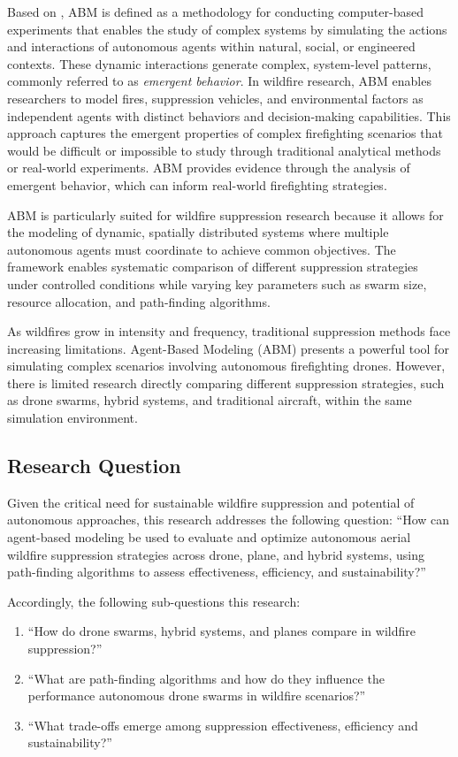 \documentclass[11pt, a4paper]{article}
\begin{document}
Based on \citet{wilensky2015introduction}, ABM is defined as a methodology for conducting computer-based experiments that enables the study of complex systems by simulating the actions and interactions of autonomous agents within natural, social, or engineered contexts. These dynamic interactions generate complex, system-level patterns, commonly referred to as \textit{emergent behavior}. In wildfire research, ABM enables researchers to model fires, suppression vehicles, and environmental factors as independent agents with distinct behaviors and decision-making capabilities. This approach captures the emergent properties of complex firefighting scenarios that would be difficult or impossible to study through traditional analytical methods or real-world experiments. ABM provides evidence through the analysis of emergent behavior, which can inform real-world firefighting strategies.

ABM is particularly suited for wildfire suppression research because it allows for the modeling of dynamic, spatially distributed systems where multiple autonomous agents must coordinate to achieve common objectives. The framework enables systematic comparison of different suppression strategies under controlled conditions while varying key parameters such as swarm size, resource allocation, and path-finding algorithms.

As wildfires grow in intensity and frequency, traditional suppression methods face increasing limitations. Agent-Based Modeling (ABM) presents a powerful tool for simulating complex scenarios involving autonomous firefighting drones. However, there is limited research directly comparing different suppression strategies, such as drone swarms, hybrid systems, and traditional aircraft, within the same simulation environment.

\subsection{Research Question}
Given the critical need for sustainable wildfire suppression and potential of autonomous approaches, this research addresses the following question:
\indent \enquote{How can agent-based modeling be used to evaluate and optimize autonomous aerial wildfire suppression strategies across drone, plane, and hybrid systems, using path-finding algorithms to assess effectiveness, efficiency, and sustainability?}

Accordingly, the following sub-questions this research:
\begin{enumerate}
  \item ``How do drone swarms, hybrid systems, and planes compare in wildfire suppression?''
  \item ``What are path-finding algorithms and how do they influence the performance autonomous drone swarms in wildfire scenarios?''
  \item ``What trade-offs emerge among suppression effectiveness, efficiency and sustainability?''
\end{enumerate}
\end{document}
